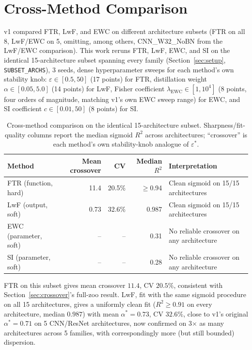\documentclass[11pt]{article}
\newcommand{\eps}{\varepsilon}
\newcommand{\epsstar}{\eps^{*}}
\begin{document}
\section{Cross-Method Comparison}
\label{sec:crossmethod}
v1 compared FTR, LwF, and EWC on different architecture subsets (FTR on all
8, LwF/EWC on 5, omitting, among others, CNN\_W32\_NoBN from the
LwF/EWC comparison). This work reruns FTR, LwF, EWC, and SI on the identical
15-architecture subset spanning every family (Section~\ref{sec:setup},
\texttt{SUBSET\_ARCHS}), 3 seeds, dense hyperparameter sweeps for each
method's own stability knob: $\eps\in[0.5,50]$ (17 points) for FTR,
distillation weight $\alpha\in[0.05,5.0]$ (14 points) for LwF, Fisher
coefficient $\lambda_{\mathrm{EWC}}\in[1,10^4]$ (8 points, four orders of
magnitude, matching v1's own EWC sweep range) for EWC, and SI coefficient
$c\in[0.01,50]$ (8 points) for SI.

\begin{table}[h]
\centering
\caption{Cross-method comparison on the identical 15-architecture subset.
Sharpness/fit-quality columns report the median sigmoid $R^2$ across
architectures; ``crossover'' is each method's own stability-knob analogue of
$\epsstar$.}
\label{tab:crossmethod}
\small
\begin{tabular}{lrrrl}
\toprule
Method & Mean crossover & CV & Median $R^2$ & Interpretation \\
\midrule
FTR (function, hard)  & 11.4  & 20.5\% & $\ge$0.94 & Clean sigmoid on 15/15 architectures \\
LwF (output, soft)    & 0.73  & 32.6\% & 0.987     & Clean sigmoid on 15/15 architectures \\
EWC (parameter, soft) & --    & --     & 0.31      & No reliable crossover on any architecture \\
SI (parameter, soft)  & --    & --     & 0.28      & No reliable crossover on any architecture \\
\bottomrule
\end{tabular}
\end{table}

FTR on this subset gives mean crossover $11.4$, CV $20.5\%$, consistent
with Section~\ref{sec:crossover}'s full-zoo result. LwF, fit with the same
sigmoid procedure on all 15 architectures, gives a uniformly clean fit
($R^2\ge0.91$ on every architecture, median $0.987$) with mean $\alpha^*=0.73$,
CV $32.6\%$, close to v1's original $\alpha^*=0.71$ on 5 CNN/ResNet
architectures, now confirmed on 3$\times$ as many architectures across
5 families, with correspondingly more (but still bounded) dispersion.
\end{document}
